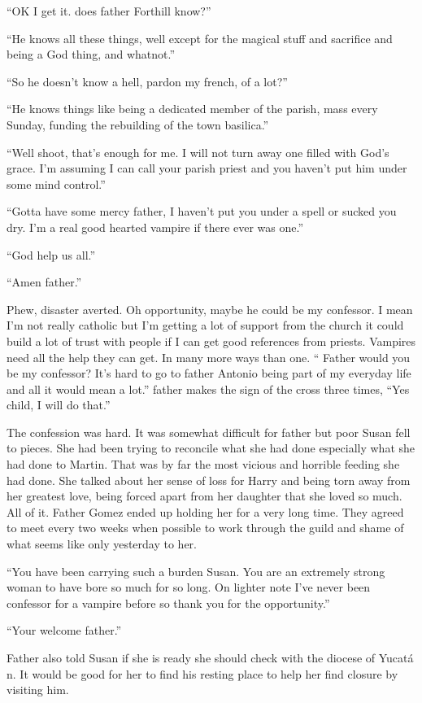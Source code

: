``OK I get it. does father Forthill know?''

``He knows all these things, well except for the magical stuff and sacrifice and being a God thing, and whatnot.''

``So he doesn't know a hell, pardon my french, of a lot?''

``He knows things like being a dedicated member of the parish, mass every Sunday, funding the rebuilding of the town basilica.''

``Well shoot, that's enough for me. I will not turn away one filled with God's grace. I'm assuming I can call your parish priest and you haven't put him under some mind control.''

``Gotta have some mercy father, I haven't put you under a spell or sucked you dry. I'm a real good hearted vampire if there ever was one.''

``God help us all.''

``Amen father.''

Phew, disaster averted. Oh opportunity, maybe he could be my confessor. I mean I'm not really catholic but I'm getting a lot of support from the church it could build a lot of trust with people if I can get good references from priests. Vampires need all the help they can get. In many more ways than one.
`` Father would you be my confessor? It's hard to go to father Antonio being part of my everyday life and all it would mean a lot.''
father makes the sign of the cross three times, ``Yes child, I will do that.''

The confession was hard. It was somewhat difficult for father but poor Susan fell to pieces. She had been trying to reconcile what she had done especially what she had done to Martin. That was by far the most vicious and horrible feeding she had done. She talked about her sense of loss for Harry and being torn away from her greatest love, being forced apart from her daughter that she loved so much. All of it. Father Gomez ended up holding her for a very long time. They agreed to meet every two weeks when possible to work through the guild and shame of what seems like only yesterday to her.

``You have been carrying such a burden Susan. You are an extremely strong woman to have bore so much for so long. On lighter note I've never been confessor for a vampire before so thank you for the opportunity.''

``Your welcome father.''

Father also told Susan if she is ready she should check with the diocese of Yucat\'{a} n. It would be good for her to find his resting place to help her find closure by visiting him.

